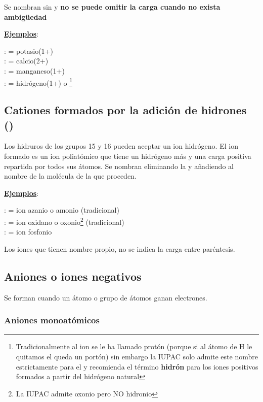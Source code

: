 \documentclass[11pt, a4paper]{article}
\begin{document}
Se nombran sin  y \textbf{no se puede omitir la carga cuando no exista ambigüedad}

\textbf{\uline{Ejemplos}}:

\noindent {} :  = potasio(1+)\\
 :  = calcio(2+)\\
 :  = manganeso(1+)\\
 :  = hidrógeno(1+) o \footnote{Tradicionalmente al ion  se le ha llamado protón (porque si al átomo de H le quitamos el  queda un portón) sin embargo la IUPAC solo admite este nombre estrictamente para el  y recomienda el término \textbf{hidrón} para los iones positivos formados a partir del hidrógeno natural}

\subsection{Cationes formados por la adición de hidrones () }

Los hidruros de los grupos 15 y 16 pueden aceptar un ion hidrógeno. El ion formado es un ion poliatómico que tiene un hidrógeno más y una carga positiva repartida por todos sus átomos. Se nombran eliminando la  y añadiendo  al nombre de la molécula de la que proceden.

\noindent \textbf{\uline{Ejemplos}}:

\noindent {} :  = ion azanio o amonio (tradicional)\\
 :  = ion oxidano o oxonio\footnote{La IUPAC admite oxonio pero NO hidronio} (tradicional)\\
 :  = ion fosfonio

Los iones que tienen nombre propio, no se indica la carga entre paréntesis.

\subsection{Aniones o iones negativos}

Se forman cuando un átomo o grupo de átomos ganan electrones.

\subsubsection{Aniones monoatómicos}
\end{document}
